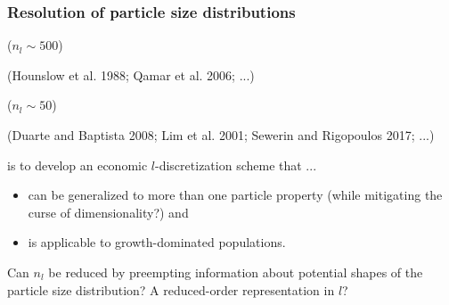 \documentclass[10pt,xcolor=dvipsnames]{beamer}
\newcommand*{\itemskip}{0.25\baselineskip}
\begin{document}

\begin{frame}[t]

  \frametitle{Resolution of particle size distributions}

  \vspace{-\baselineskip}
  \begin{minipage}[t]{0.46\columnwidth}\vskip0pt
   ($n_l \sim 500$)
  \begin{center}
  \resizebox{0.65\columnwidth}{!}{}
  \end{center}
  \vspace{-\baselineskip}
  {\footnotesize(Hounslow et al. 1988; Qamar et al. 2006; ...)} \nocite{Hounslow1988, Qamar2006}
  \end{minipage}\hfill
  \begin{minipage}[t]{0.46\columnwidth}\vskip0pt
   ($n_l \sim 50$)
  \begin{center}
  \resizebox{0.65\columnwidth}{!}{}
  \end{center}
  \vspace{-\baselineskip}
  {\footnotesize(Duarte and Baptista 2008; Lim et al. 2001; Sewerin and Rigopoulos 2017; ...)} \nocite{Lim2001, Duarte2008, Sewerin2017}
  \end{minipage}
  \vspace{\baselineskip}

   is to develop an economic $l$-discretization scheme that ...
  \begin{itemize}
  \vspace{\itemskip}
  \item\justifying can be generalized to more than one particle property (while mitigating the curse of dimensionality?) and
  \vspace{\itemskip}
  \item is applicable to growth-dominated populations.
  \end{itemize}

  \begin{snugshade}
  \justifying Can $n_l$ be reduced by preempting information about potential shapes of the particle size distribution? A reduced-order representation in $l$?
  \end{snugshade}

\end{frame}
\end{document}
